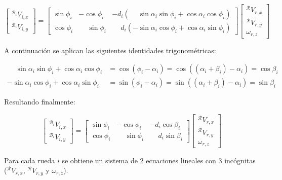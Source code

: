\documentclass[11pt,a4paper]{article}
\newcommand{\frameR}{\mathcal{R}}
\newcommand{\frameBi}{\mathcal{B}_i}
\begin{document}
\[
    \begin{bmatrix}
        {}^{\frameBi}V_{i,x} \\
        {}^{\frameBi}V_{i,y}
    \end{bmatrix} = \begin{bmatrix}
        \sin\phi_i & -\cos\phi_i           & -d_i(\phantom{-}\sin\alpha_i\sin\phi_i + \cos\alpha_i\cos\phi_i) \\
        \cos\phi_i & \phantom{-}\sin\phi_i & \phantom{-}d_i(-\sin\alpha_i\cos\phi_i + \cos\alpha_i\sin\phi_i)
    \end{bmatrix} \begin{bmatrix}
        {}^{\frameR}V_{r,x} \\
        {}^{\frameR}V_{r,y} \\
        \omega_{r,z}
    \end{bmatrix}
\]

A continuación se aplican las siguientes identidades trigonométricas:

\[
    \begin{aligned}
        \phantom{-}\sin\alpha_i\sin\phi_i + \cos\alpha_i\cos\phi_i & = \cos(\phi_i - \alpha_i) = \cos((\alpha_i + \beta_i) - \alpha_i) = \cos\beta_i \\
        -\sin\alpha_i\cos\phi_i + \cos\alpha_i\sin\phi_i           & = \sin(\phi_i - \alpha_i) = \sin((\alpha_i + \beta_i) - \alpha_i) = \sin\beta_i
    \end{aligned}
\]

Resultando finalmente:

\begin{equation}
    \begin{bmatrix}
        {}^{\frameBi}V_{i,x} \\
        {}^{\frameBi}V_{i,y}
    \end{bmatrix} = \begin{bmatrix}
        \sin\phi_i & -\cos\phi_i           & -d_i\cos\beta_i           \\
        \cos\phi_i & \phantom{-}\sin\phi_i & \phantom{-}d_i\sin\beta_i
    \end{bmatrix} \begin{bmatrix}
        {}^\frameR V_{r,x} \\
        {}^\frameR V_{r,y} \\
        \omega_{r,z}
    \end{bmatrix}
    \label{eq:wheel-constraints-final}
\end{equation}

Para cada rueda \(i\) se obtiene un sistema de 2 ecuaciones lineales con 3 incógnitas (\({}^\frameR V_{r,x}\), \({}^\frameR V_{r,y}\) y \(\omega_{r,z}\)).
\end{document}
